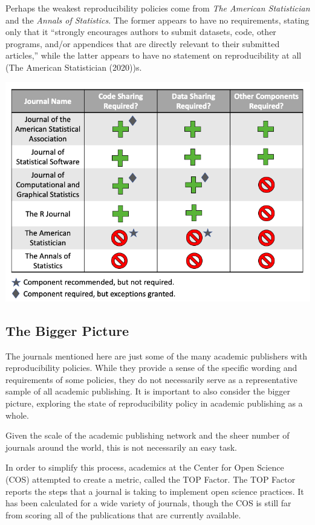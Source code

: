\documentclass[12pt,twoside]{reedthesis}
\begin{document}
Perhaps the weakest reproducibility policies come from \emph{The
American Statistician} and the \emph{Annals of Statistics}. The former
appears to have no requirements, stating only that it ``strongly
encourages authors to submit datasets, code, other programs, and/or
appendices that are directly relevant to their submitted articles,''
while the latter appears to have no statement on reproducibility at all
(The American Statistician (2020))s.
\begin{center}\includegraphics[width=1\linewidth]{figure/stats-journals} \end{center}

\subsection{The Bigger Picture}\label{the-bigger-picture}

The journals mentioned here are just some of the many academic
publishers with reproducibility policies. While they provide a sense of
the specific wording and requirements of some policies, they do not
necessarily serve as a representative sample of all academic publishing.
It is important to also consider the bigger picture, exploring the state
of reproducibility policy in academic publishing as a whole.

Given the scale of the academic publishing network and the sheer number
of journals around the world, this is not necessarily an easy task.

In order to simplify this process, academics at the Center for Open
Science (COS) attempted to create a metric, called the TOP Factor. The
TOP Factor reports the steps that a journal is taking to implement open
science practices. It has been calculated for a wide variety of
journals, though the COS is still far from scoring all of the
publications that are currently available.
\end{document}
